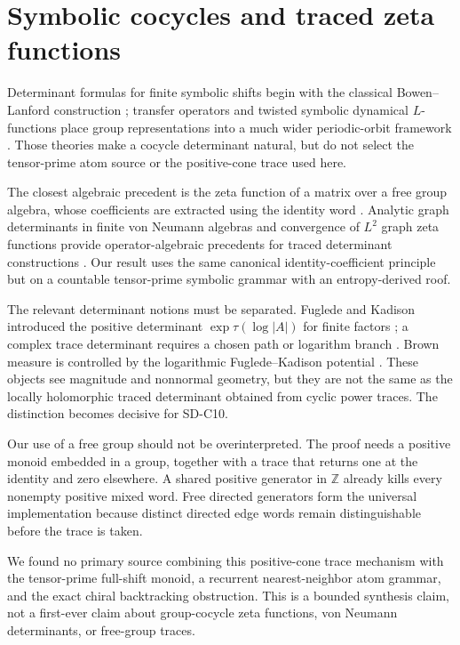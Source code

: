 \section{Symbolic cocycles and traced zeta functions}
\label{sec:related}

Determinant formulas for finite symbolic shifts begin with the classical
Bowen--Lanford construction \citep{bowenlanford1970}; transfer operators and
twisted symbolic dynamical $L$-functions place group representations into a
much wider periodic-orbit framework \citep{ruelle1976,parrypollicott1990}.
Those theories make a cocycle determinant natural, but do not select the
tensor-prime atom source or the positive-cone trace used here.

The closest algebraic precedent is the zeta function of a matrix over a free
group algebra, whose coefficients are extracted using the identity word
\citep{kasselreutenauer2014}.  Analytic graph determinants in finite von
Neumann algebras and convergence of $L^2$ graph zeta functions provide
operator-algebraic precedents for traced determinant constructions
\citep{clairmokhtari2002,guidoisolalapidus2009}.  Our result uses the same
canonical identity-coefficient principle but on a countable tensor-prime
symbolic grammar with an entropy-derived roof.

The relevant determinant notions must be separated.  Fuglede and Kadison
introduced the positive determinant $\exp\tau(\log|A|)$ for finite factors
\citep{fugledekadison1952}; a complex trace determinant requires a chosen
path or logarithm branch \citep{delaharpeskandalis1984}.  Brown measure is
controlled by the logarithmic Fuglede--Kadison potential
\citep{haagerupschultz2007}.  These objects see magnitude and nonnormal
geometry, but they are not the same as the locally holomorphic traced
determinant obtained from cyclic power traces.  The distinction becomes
decisive for SD-C10.

Our use of a free group should not be overinterpreted.  The proof needs a
positive monoid embedded in a group, together with a trace that returns one
at the identity and zero elsewhere.  A shared positive generator in
$\mathbb Z$ already kills every nonempty positive mixed word.  Free directed
generators form the universal implementation because distinct directed edge
words remain distinguishable before the trace is taken.

We found no primary source combining this positive-cone trace mechanism with
the tensor-prime full-shift monoid, a recurrent nearest-neighbor atom grammar,
and the exact chiral backtracking obstruction.  This is a bounded synthesis
claim, not a first-ever claim about group-cocycle zeta functions, von
Neumann determinants, or free-group traces.

